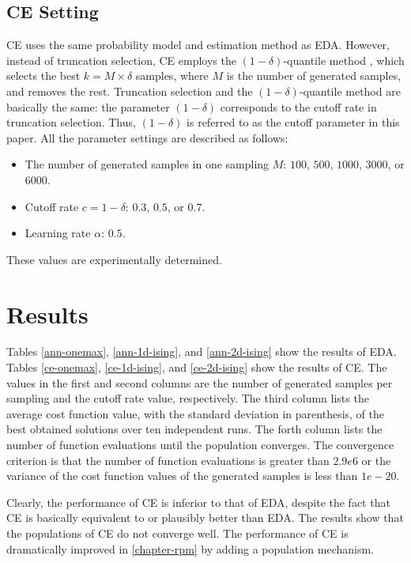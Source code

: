 \subsection{CE Setting}
CE uses the same probability model and estimation method
as EDA.
However, instead of truncation selection,
CE employs the $(1-\delta)$-quantile method \cite{rubinstein:ce},
which selects the best $k=M\times\delta$ samples, where $M$ is
the number of generated samples, and removes the rest.
Truncation selection and the \mbox{$(1-\delta)$-quantile} method 
are basically the same:
the parameter $(1-\delta)$ corresponds to
the cutoff rate in truncation selection. 
Thus, $(1-\delta)$ is referred to as the cutoff parameter in this paper.
All the parameter settings are described as follows:
\begin{itemize}
 \item The number of generated samples in one sampling $M$: $100$, $500$,
$1000$, $3000$, or $6000$.
 \item Cutoff rate $c=1-\delta$: $0.3$, $0.5$, or $0.7$.
 \item Learning rate $\alpha$: $0.5$.
\end{itemize}
These values are experimentally determined.

\section{Results}


Tables \ref{ann-onemax}, \ref{ann-1d-ising}, and \ref{ann-2d-ising}
show the results of EDA.
Tables \ref{ce-onemax}, \ref{ce-1d-ising}, and \ref{ce-2d-ising}
show the results of CE.
The values in the first and second columns are
the number of generated samples per sampling and the cutoff rate value, 
respectively.
The third column lists the average cost function value,
 with the standard deviation
in parenthesis,  of the best obtained solutions over ten independent runs.
The forth column lists the number of function evaluations
until the population converges.
The convergence criterion is that the number of function evaluations
is greater than $2.9e6$ or the variance of the cost function values
of the generated samples is less than $1e-20$.

Clearly, the performance of CE is inferior to that of EDA, 
despite the fact that
CE is  basically equivalent to or plausibly better than EDA.
The results show that the populations of CE do not converge well.
The performance of CE is dramatically improved in \ref{chapter-rpm}
by adding a population mechanism.
